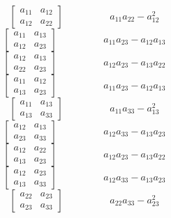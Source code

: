 
$$\left[\begin{matrix}a_{11} & a_{12}\\a_{12} & a_{22}\end{matrix}\right]\hspace{2cm} a_{11} a_{22} - a_{12}^{2}$$   
$$\left[\begin{matrix}a_{11} & a_{13}\\a_{12} & a_{23}\end{matrix}\right]\hspace{2cm} a_{11} a_{23} - a_{12} a_{13}$$   
$$\left[\begin{matrix}a_{12} & a_{13}\\a_{22} & a_{23}\end{matrix}\right]\hspace{2cm} a_{12} a_{23} - a_{13} a_{22}$$   
$$\left[\begin{matrix}a_{11} & a_{12}\\a_{13} & a_{23}\end{matrix}\right]\hspace{2cm} a_{11} a_{23} - a_{12} a_{13}$$   
$$\left[\begin{matrix}a_{11} & a_{13}\\a_{13} & a_{33}\end{matrix}\right]\hspace{2cm} a_{11} a_{33} - a_{13}^{2}$$   
$$\left[\begin{matrix}a_{12} & a_{13}\\a_{23} & a_{33}\end{matrix}\right]\hspace{2cm} a_{12} a_{33} - a_{13} a_{23}$$   
$$\left[\begin{matrix}a_{12} & a_{22}\\a_{13} & a_{23}\end{matrix}\right]\hspace{2cm} a_{12} a_{23} - a_{13} a_{22}$$   
$$\left[\begin{matrix}a_{12} & a_{23}\\a_{13} & a_{33}\end{matrix}\right]\hspace{2cm} a_{12} a_{33} - a_{13} a_{23}$$   
$$\left[\begin{matrix}a_{22} & a_{23}\\a_{23} & a_{33}\end{matrix}\right]\hspace{2cm} a_{22} a_{33} - a_{23}^{2}$$